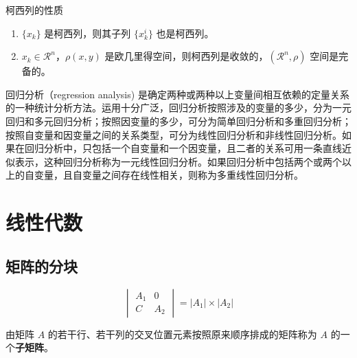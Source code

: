 \documentclass{elegantbook}
\begin{document}
\begin{property}
柯西列的性质
\begin{enumerate}[noitemsep]
\item $\{x_k\}$ 是柯西列，则其子列 $\{x_k^i\}$ 也是柯西列。
\item $x_k\in \mathcal{R}^n$，$\rho(x,y)$ 是欧几里得空间，则柯西列是收敛的，$(\mathcal{R}^n,\rho)$ 空间是完备的。
\end{enumerate}
\end{property}


\begin{conclusion}
回归分析（regression analysis) 是确定两种或两种以上变量间相互依赖的定量关系的一种统计分析方法。运用十分广泛，回归分析按照涉及的变量的多少，分为一元回归和多元回归分析；按照因变量的多少，可分为简单回归分析和多重回归分析；按照自变量和因变量之间的关系类型，可分为线性回归分析和非线性回归分析。如果在回归分析中，只包括一个自变量和一个因变量，且二者的关系可用一条直线近似表示，这种回归分析称为一元线性回归分析。如果回归分析中包括两个或两个以上的自变量，且自变量之间存在线性相关，则称为多重线性回归分析。
\end{conclusion}



\nocite{EINAV2010,Havrylchyk2018} 




\appendix
\chapter{线性代数}

\section{矩阵的分块}

\begin{equation} 
\begin{vmatrix}
A_1 & 0\\
C & A_2
\end{vmatrix}
=|A_1|\times |A_2|
\end{equation}

由矩阵 $A$ 的若干行、若干列的交叉位置元素按照原来顺序排成的矩阵称为 $A$ 的一个\textbf{子矩阵}。
\end{document}
